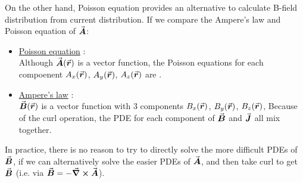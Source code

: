\documentclass[class=article, crop=false, 12pt]{standalone}
\begin{document}
On the other hand, Poisson equation provides an alternative to calculate B-field distribution from current distribution.
If we compare the Ampere's law and Poisson equation of $\va*{A}$:
\begin{itemize}
    \item \ul{Poisson equation} : \\[1ex]
    Although $\va*{A}(\va*{r})$ is a vector function,
    the Poisson equations for each compoenent $A_x(\va*{r})$, $A_y(\va*{r})$, $A_z(\va*{r})$ 
    are .
    

    \item \ul{Ampere's law} :\\[1ex]
    $\va*{B}(\va*{r})$ is a vector function with 3 components $B_x(\va*{r})$, $B_y(\va*{r})$, $B_z(\va*{r})$,
    Because of the curl operation, 
    the PDE for each component of $\va*{B}$ and $\va*{J}$ all mix together.

\end{itemize}

In practice, there is no reason to try to directly solve the more difficult PDEs of $\va*{B}$,
if we can alternatively solve the easier PDEs of $\va*{A}$,
and then take curl to get $\va*{B}$ (i.e. via $\va*{B} = -\curl \va*{A}$). 
\end{document}

